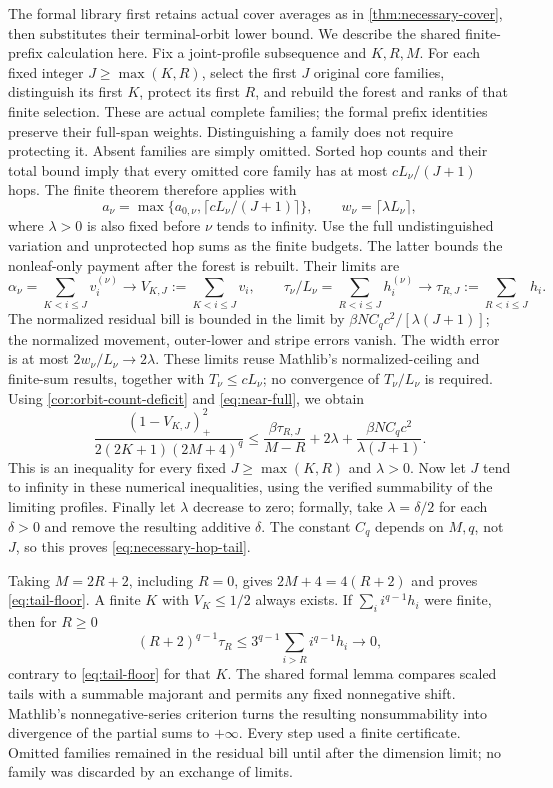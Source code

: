 \begin{outline}
The formal library first retains actual cover averages as in
\cref{thm:necessary-cover}, then substitutes their terminal-orbit lower
bound. We describe the shared finite-prefix calculation here.
Fix a joint-profile subsequence and $K,R,M$. For each fixed integer
$J\ge\max(K,R)$, select the first $J$ original core families, distinguish its
first $K$, protect its first $R$, and rebuild the forest and ranks of
that finite selection. These are actual complete families; the formal
prefix identities preserve their full-span weights. Distinguishing a family
does not require protecting it. Absent families are simply omitted. Sorted hop
counts and their total bound imply that every omitted core family has
at most $cL_\nu/(J+1)$ hops. The finite theorem therefore applies with
\[
 a_\nu=\max\{a_{0,\nu},\lceil cL_\nu/(J+1)\rceil\},\qquad
 w_\nu=\lceil\lambda L_\nu\rceil,
\]
where $\lambda>0$ is also fixed before $\nu$ tends to infinity.
Use the full undistinguished variation and unprotected hop sums as the
finite budgets. The latter bounds the nonleaf-only payment after the
forest is rebuilt. Their limits are
\[
 \alpha_\nu=\sum_{K<i\le J}v_i^{(\nu)}
   \longrightarrow V_{K,J}:=\sum_{K<i\le J}v_i,\qquad
 \tau_\nu/L_\nu=\sum_{R<i\le J}h_i^{(\nu)}
   \longrightarrow\tau_{R,J}:=\sum_{R<i\le J}h_i.
\]
The normalized residual bill is bounded in the limit by
$\beta NC_qc^2/[\lambda(J+1)]$; the normalized movement, outer-lower
and stripe errors vanish. The width error is at most
$2w_\nu/L_\nu\to2\lambda$. These limits reuse Mathlib's normalized-ceiling
and finite-sum results, together with $T_\nu\le cL_\nu$; no convergence
of $T_\nu/L_\nu$ is required.
Using \cref{cor:orbit-count-deficit} and \cref{eq:near-full}, we obtain
\begin{equation}\label{eq:finite-prefix-limit}
 \frac{(1-V_{K,J})_+^2}{2(2K+1)(2M+4)^q}
 \le\frac{\beta\tau_{R,J}}{M-R}+2\lambda
       +\frac{\beta NC_qc^2}{\lambda(J+1)}.
\end{equation}
This is an inequality for every fixed $J\ge\max(K,R)$ and $\lambda>0$.
Now let $J$ tend to infinity in these numerical inequalities, using the
verified summability of the limiting profiles. Finally let $\lambda$
decrease to zero; formally, take $\lambda=\delta/2$ for each $\delta>0$
and remove the resulting additive $\delta$.
The constant $C_q$ depends on $M,q$, not $J$, so this proves
\cref{eq:necessary-hop-tail}.

Taking $M=2R+2$, including $R=0$, gives $2M+4=4(R+2)$ and proves
\cref{eq:tail-floor}. A finite $K$ with $V_K\le1/2$ always exists.
If $\sum_i i^{q-1}h_i$ were finite, then for $R\ge0$
\[
 (R+2)^{q-1}\tau_R
 \le3^{q-1}\sum_{i>R}i^{q-1}h_i\longrightarrow0,
\]
contrary to \cref{eq:tail-floor} for that $K$. The shared formal lemma
compares scaled tails with a summable majorant and permits any fixed
nonnegative shift. Mathlib's nonnegative-series criterion turns the
resulting nonsummability into divergence of the partial sums to $+\infty$.
Every step used a finite certificate. Omitted families remained in the
residual bill until after the dimension limit; no family was discarded
by an exchange of limits.
\end{outline}

